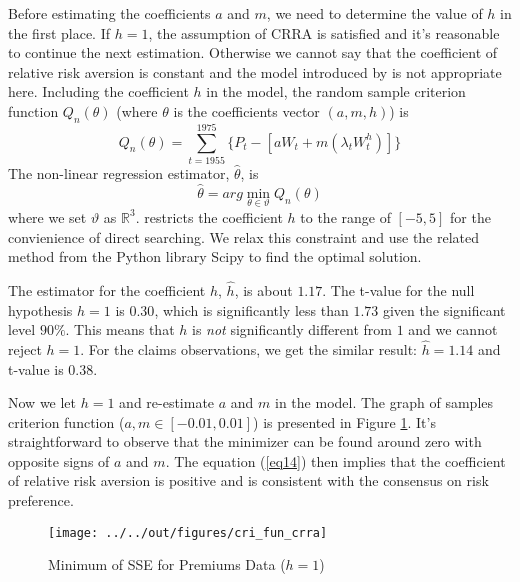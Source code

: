\documentclass[11pt, a4paper, leqno]{article}
\begin{document}
Before estimating the coefficients $a$ and $m$, we need to determine the value of $h$ in the first place. If $h=1$, the assumption of CRRA is satisfied and it's reasonable to continue the next estimation. Otherwise we cannot say that the coefficient of relative risk aversion is constant and the model introduced by \citet{szpiro1986measuring} is not appropriate here. Including the coefficient $h$ in the model, the random sample criterion function $Q_n(\theta)$ (where $\theta$ is the coefficients vector $(a, m, h)$) is 
\begin{equation}
Q_n(\theta)=\sum_{t=1955}^{1975}\{P_t-[aW_{t}+m(\lambda_{t}W_{t}^{h})]\}
\end{equation}
The non-linear regression estimator, $\hat{\theta}$, is
\begin{equation}
\hat{\theta}=arg \min \limits_{\theta\in \vartheta} Q_n(\theta)
\end{equation}
where we set $\vartheta$ as $\mathbb{R}^{3}$. \citet{szpiro1986measuring} restricts the coefficient $h$ to the range of $[-5, 5]$ for the convienience of direct searching. We relax this constraint and use the related method from the Python library Scipy to find the optimal solution.

The estimator for the coefficient $h$, $\hat{h}$, is about $1.17$. The t-value for the null hypothesis $h=1$ is $0.30$, which is significantly less than $1.73$ given the significant level $90\%$. This means that $h$ is \textit{not} significantly different from $1$ and we cannot reject $h=1$. For the claims observations, we get the similar result: $\hat{h}=1.14$ and t-value is $0.38$.

Now we let $h=1$ and re-estimate $a$ and $m$ in the model. The graph of samples criterion function ($a, m \in [-0.01, 0.01]$) is presented in Figure \ref{sse figure}. It's straightforward to observe that the minimizer can be found around zero with opposite signs of $a$ and $m$. The equation (\ref{eq14}) then implies that the coefficient of relative risk aversion is positive and is consistent with the consensus on risk preference.

\begin{figure}[H]
\caption{Minimum of SSE for Premiums Data ($h=1$)}
\texttt{[image: ../../out/figures/cri\_fun\_crra]}\label{sse figure}

\end{figure}
\end{document}
